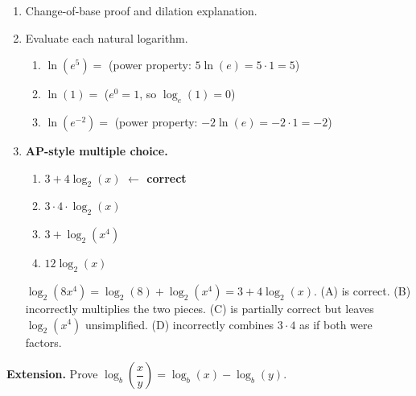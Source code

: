 \documentclass[10pt]{article}
\begin{document}
\begin{enumerate}[leftmargin=1.8em, itemsep=14pt]
\item Change-of-base proof and dilation explanation.


\item Evaluate each natural logarithm.

\begin{enumerate}[leftmargin=1.5em, itemsep=6pt, label=\alph*.]
  \item $\ln(e^5) = $  \quad (power property: $5\ln(e) = 5 \cdot 1 = 5$)

  \item $\ln(1) = $  \quad ($e^0 = 1$, so $\log_e(1) = 0$)

  \item $\ln(e^{-2}) = $  \quad (power property: $-2\ln(e) = -2 \cdot 1 = -2$)
\end{enumerate}

\item \textbf{AP-style multiple choice.}

\begin{enumerate}[leftmargin=2em, itemsep=4pt, label=(\Alph*)]
  \item $3 + 4\log_2(x)$ \quad \textcolor{keyred}{\textbf{$\leftarrow$ correct}}
  \item $3 \cdot 4 \cdot \log_2(x)$
  \item $3 + \log_2(x^4)$
  \item $12\log_2(x)$
\end{enumerate}

\begin{teachernote}
$\log_2(8x^4) = \log_2(8) + \log_2(x^4) = 3 + 4\log_2(x)$. (A) is correct.
(B) incorrectly multiplies the two pieces. (C) is partially correct but leaves $\log_2(x^4)$
unsimplified. (D) incorrectly combines $3 \cdot 4$ as if both were factors.
\end{teachernote}

\end{enumerate}

\vspace{0.12in}

\begin{practicebox}
\textbf{Extension.} Prove $\log_b\!\left(\dfrac{x}{y}\right) = \log_b(x) - \log_b(y)$.

\end{practicebox}
\end{document}
